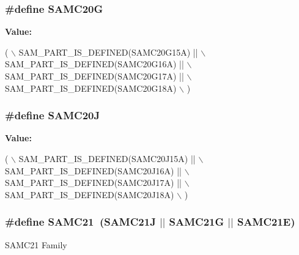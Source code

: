 \subsubsection[{S\+A\+M\+C20\+G}]{\setlength{\rightskip}{0pt plus 5cm}\#define S\+A\+M\+C20\+G}\label{group__sam__part__macros__group_gaae8339de60d66fd1ea8ab4d71500eee3}
{\bfseries Value\+:}
\begin{DoxyCode}
( \(\backslash\)
        SAM\_PART\_IS\_DEFINED(SAMC20G15A) || \(\backslash\)
        SAM\_PART\_IS\_DEFINED(SAMC20G16A) || \(\backslash\)
        SAM\_PART\_IS\_DEFINED(SAMC20G17A) || \(\backslash\)
        SAM\_PART\_IS\_DEFINED(SAMC20G18A) \(\backslash\)
    )
\end{DoxyCode}
\hypertarget{group__sam__part__macros__group_gaf87c13f9dc254f1b09d6a4510e1f43bd}{}
\subsubsection[{S\+A\+M\+C20\+J}]{\setlength{\rightskip}{0pt plus 5cm}\#define S\+A\+M\+C20\+J}\label{group__sam__part__macros__group_gaf87c13f9dc254f1b09d6a4510e1f43bd}
{\bfseries Value\+:}
\begin{DoxyCode}
( \(\backslash\)
        SAM\_PART\_IS\_DEFINED(SAMC20J15A) || \(\backslash\)
        SAM\_PART\_IS\_DEFINED(SAMC20J16A) || \(\backslash\)
        SAM\_PART\_IS\_DEFINED(SAMC20J17A) || \(\backslash\)
        SAM\_PART\_IS\_DEFINED(SAMC20J18A) \(\backslash\)
    )
\end{DoxyCode}
\hypertarget{group__sam__part__macros__group_ga0ebd751fff25acbc104dcaeef418fcff}{}
\subsubsection[{S\+A\+M\+C21}]{\setlength{\rightskip}{0pt plus 5cm}\#define S\+A\+M\+C21~(S\+A\+M\+C21\+J $\vert$$\vert$ S\+A\+M\+C21\+G $\vert$$\vert$ S\+A\+M\+C21\+E)}\label{group__sam__part__macros__group_ga0ebd751fff25acbc104dcaeef418fcff}
S\+A\+M\+C21 Family \hypertarget{group__sam__part__macros__group_ga3f154a978288c66ee8c267dcc90d34bd}{}
